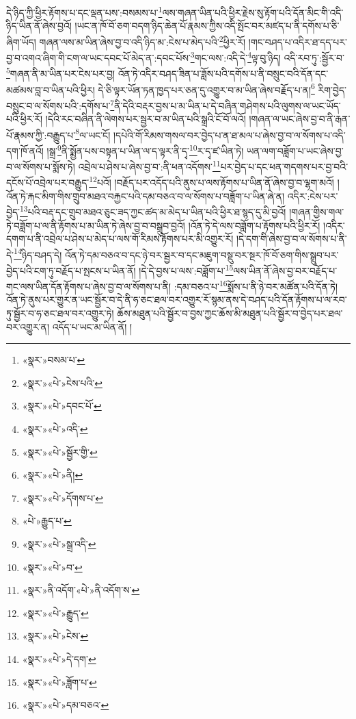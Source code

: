 དེ་ཉིད་ཀྱི་ཕྱིར་རྟོགས་པ་དང་ལྡན་པས་:བསམས་པ་\footnote{«སྣར་»བསམ་པ་}ལས་གཞན་ཡིན་པའི་ཕྱིར་རྗེས་སུ་རྟོག་པའི་དོན་མིང་གི་འདི་ཉིད་ཡིན་ནོ་ཞེས་བྱའོ། །ཡང་ན་ཁོ་བོ་ཅག་བདག་ཉིད་ཆེན་པོ་རྣམས་ཀྱིས་འདི་སྤོང་བར་མཛད་པ་ནི་དགོས་པ་ཅི་ཞིག་ཡོད། གཞན་ལས་མ་ཡིན་ཞེས་བྱ་བ་འདི་ཉིད་མ་:ངེས་པ་མེད་པའི་\footnote{«སྣར་»«པེ་»ངེས་པའི་}ཕྱིར་རོ། །གང་བཤད་པ་འདིར་ཐ་དད་པར་བྱ་བ་འགའ་ཞིག་གི་ངག་ལ་ཡང་དབང་པོ་མེད་ན་:དབང་པོས་\footnote{«སྣར་»«པེ་»དབང་པོ་}གང་ལས་:འདི་དེ་\footnote{«སྣར་»«པེ་»འདི་}ལྟ་བུ་ཉིད། འདི་རབ་ཏུ་:སྦྱོར་བ་\footnote{«སྣར་»«པེ་»སྦྱོར་གྱི་}གཞན་ནི་མ་ཡིན་པར་ངེས་པར་བྱ། འོན་ཏེ་འདིར་བཤད་ཟིན་པ་ཟློས་པའི་དགོས་པ་ནི་བསྲུང་བའི་དོན་དང་མཚམས་བླ་བ་ཡིན་པའི་ཕྱིར། དེ་ཅི་ལྟར་ཡོན་ཏན་ཁྱད་པར་ཅན་དུ་འགྱུར་བ་མ་ཡིན་ཞེས་བརྗོད་པ་ན།\footnote{«སྣར་»«པེ་»ནི།} རིག་བྱེད་བསྲུང་བ་ལ་སོགས་པའི་:དགོས་པ་\footnote{«སྣར་»«པེ་»དོགས་པ་}ནི་དེའི་བརྡར་བྱས་པ་མ་ཡིན་པ་དེ་བཞིན་གཤེགས་པའི་ལུགས་ལ་ཡང་ཡོད་པའི་ཕྱིར་རོ། །དེའི་རང་བཞིན་ནི་ལེགས་པར་སྦྱར་བ་མ་ཡིན་པའི་སྒྲའི་ངོ་བོ་ལའོ། །གཞན་ལ་ཡང་ཞེས་བྱ་བ་ནི་རྒན་པོ་རྣམས་ཀྱི་:བརྒྱུད་པ་\footnote{«པེ་»རྒྱུད་པ་}ལ་ཡང་ངོ། །དཔེའི་གོ་རིམས་གསལ་བར་བྱེད་པ་ན་ཐ་མལ་པ་ཞེས་བྱ་བ་ལ་སོགས་པ་འདི་དག་ཁོ་ནའོ། །སྒྲ་\footnote{«སྣར་»«པེ་»སྒྲ་འདི་}ནི་སྨྱོན་པས་བསྟན་པ་ཡིན་ལ་ད་ལྟར་ནི་དྭ་\footnote{«སྣར་»«པེ་»བ་}ར་དྭ་ཛ་ཡིན་ཏེ། ཡན་ལག་བཟློག་པ་ཡང་ཞེས་བྱ་བ་ལ་སོགས་པ་སྨོས་ཏེ། འབྲེལ་པ་ཤེས་པ་ཞེས་བྱ་བ་:ནི་ཕན་འདོགས་\footnote{«སྣར་»ནི་འདོག་«པེ་»ནི་འདོག་ས་}པར་བྱེད་པ་དང་ཕན་གདགས་པར་བྱ་བའི་དངོས་པོ་འབྲེལ་པར་བརྒྱུད་\footnote{«སྣར་»«པེ་»རྒྱུད་}པའོ། །བརྗོད་པར་འདོད་པའི་ནུས་པ་ལས་རྟོགས་པ་ཡིན་ནོ་ཞེས་བྱ་བ་ལྷག་མའོ། །འོན་ཏེ་རྐང་མིག་གིས་གྲུབ་མཐའ་བརྐྱང་པའི་དམ་བཅའ་བ་ལ་སོགས་པ་བཟློག་པ་ཡིན་ཞེ་ན། འདིར་:ངེས་པར་བྱེད་\footnote{«སྣར་»«པེ་»ངེས་}པའི་བརྡ་དང་གྲུབ་མཐའ་ཅུང་ཟད་ཀྱང་ཚད་མ་མེད་པ་ཡིན་པའི་ཕྱིར་ཐ་སྙད་དུ་མི་བྱའོ། །གཞན་གྱིས་གལ་ཏེ་བཟློག་པ་ལ་ནི་རྟོགས་པ་མ་ཡིན་ཏེ་ཞེས་བྱ་བ་བསྒྲུབ་བྱའོ། །འོན་ཏེ་དེ་ལས་བཟློག་པ་རྟོགས་པའི་ཕྱིར་རོ། །འདིར་དགག་པ་ནི་འབྲེལ་པ་ཤེས་པ་མེད་པ་ལས་གོ་རིམས་རྟོགས་པར་མི་འགྱུར་རོ། །དེ་དག་གི་ཞེས་བྱ་བ་ལ་སོགས་པ་ནི་དེ་\footnote{«སྣར་»«པེ་»དེ་དག་}ཉིད་བཤད་དེ། འོན་ཏེ་དམ་བཅའ་བ་དང་ཉེ་བར་སྦྱར་བ་དང་མཇུག་བསྡུ་བར་སྔར་ཁོ་བོ་ཅག་གིས་སྒྲུབ་པར་བྱེད་པའི་ངག་ཏུ་བརྗོད་པ་སྤངས་པ་ཡིན་ནོ། །དེ་དེ་བྱས་པ་ལས་:བཟློག་པ་\footnote{«སྣར་»«པེ་»ཟློག་པ་}ལས་ཡིན་ནོ་ཞེས་བྱ་བར་བརྗོད་པ་གང་ལས་ཡིན་དོན་རྟོགས་པ་ཞེས་བྱ་བ་ལ་སོགས་པ་ནི། :དམ་བཅའ་པ་\footnote{«སྣར་»«པེ་»དམ་བཅའ་}སྨོས་པ་ནི་ཉེ་བར་མཚོན་པའི་དོན་ཏེ། འོན་ཏེ་ནུས་པར་གྱུར་ན་ཡང་སྦྱོར་བ་དེ་ནི་ཧ་ཅང་ཐལ་བར་འགྱུར་རོ་སྙམ་ནས་དེ་བཤད་པའི་དོན་རྟོགས་པ་ལ་རབ་ཏུ་སྦྱོར་བ་ཧ་ཅང་ཐལ་བར་འགྱུར་ཏེ། ཆོས་མཐུན་པའི་སྦྱོར་བ་བྱས་ཀྱང་ཆོས་མི་མཐུན་པའི་སྦྱོར་བ་བྱེད་པར་ཐལ་བར་འགྱུར་ན། འདོད་པ་ཡང་མ་ཡིན་ནོ། །
